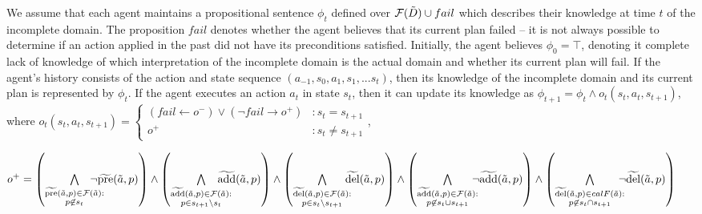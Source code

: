 \documentclass{article}
\begin{document}
We assume that each agent maintains a propositional sentence $\phi_t$ defined over ${\cal F}(\tilde{D}) \cup fail$ which describes their knowledge at time $t$ of the incomplete domain.  The proposition $fail$ denotes whether the agent believes that its current plan failed -- it is not always possible to determine if an action applied in the past did not have its preconditions satisfied.  Initially, the agent believes $\phi_0 = \top$, denoting it complete lack of knowledge of which interpretation of the incomplete domain is the actual domain and whether its current plan will fail. If the agent's history consists of the action and state sequence $(a_{-1}, s_0, a_1, s_1, ... s_t)$, then its knowledge of the incomplete domain and its current plan is represented by $\phi_t$.   If the agent executes an action $a_t$ in state $s_t$, then it can update its knowledge as $\phi_{t+1} = \phi_t \wedge o_t(s_t, a_t, s_{t+1})$, where 
$o_t(s_t, a_t, s_{t+1})= \left\{ \begin{array}{ll}
(fail \leftarrow o^-) \vee (\neg fail \rightarrow o^+)  &: s_t = s_{t+1}\\
o^+  & : s_t \not= s_{t+1}
\end{array}\right.$,

\noindent  $o^+=\left(\bigwedge\limits_{\substack{\widetilde{\text{pre}}(\tilde{a},p) \in {\cal F}(\tilde{a}):\\ p \not\in s_t} }\hspace*{-0.5cm}\neg \widetilde{\text{pre}}(\tilde{a},p)  \right)\wedge  \left(\bigwedge\limits_{\substack{\widetilde{\text{add}}(\tilde{a},p) \in {\cal F}(\tilde{a}):\\ p\in s_{t+1}\backslash s_t} }\hspace*{-0.5cm}\widetilde{\text{add}}(\tilde{a},p)  \right) \wedge  \left(\bigwedge\limits_{\substack{\widetilde{\text{del}}(\tilde{a},p) \in {\cal F}(\tilde{a}): \\p \in s_t\backslash s_{t+1}}} \hspace*{-0.25cm}\widetilde{\text{del}}(\tilde{a},p)  \right) \wedge \left(\bigwedge\limits_{\substack{\widetilde{\text{add}}(\tilde{a},p) \in {\cal F}(\tilde{a}): \\ p \not\in  s_t\cup s_{t+1}}} \hspace*{-0.25cm}\neg \widetilde{\text{add}}(\tilde{a},p)  \right)\wedge  \left(\bigwedge\limits_{\substack{\widetilde{\text{del}}(\tilde{a},p) \in {cal F}(\tilde{a}):\\ p \not\in s_t\cap s_{t+1}}} \hspace*{-0.25cm}\neg \widetilde{\text{del}}(\tilde{a},p)  \right) $
\end{document}
